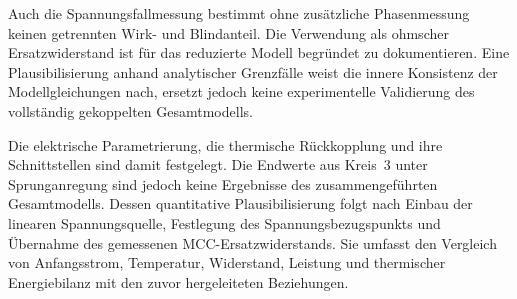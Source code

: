 Auch die Spannungsfallmessung bestimmt ohne zusätzliche Phasenmessung keinen
getrennten Wirk- und Blindanteil. Die Verwendung als ohmscher
Ersatzwiderstand ist für das reduzierte Modell begründet zu dokumentieren.
Eine Plausibilisierung anhand analytischer Grenzfälle weist die innere
Konsistenz der Modellgleichungen nach, ersetzt jedoch keine experimentelle
Validierung des vollständig gekoppelten Gesamtmodells.

Die elektrische Parametrierung, die thermische Rückkopplung und ihre
Schnittstellen sind damit festgelegt. Die Endwerte aus Kreis~3 unter
Sprunganregung sind jedoch keine Ergebnisse des zusammengeführten
Gesamtmodells. Dessen quantitative Plausibilisierung folgt nach Einbau der
linearen Spannungsquelle, Festlegung des Spannungsbezugspunkts und Übernahme
des gemessenen MCC-Ersatzwiderstands. Sie umfasst den Vergleich von
Anfangsstrom, Temperatur, Widerstand, Leistung und thermischer Energiebilanz
mit den zuvor hergeleiteten Beziehungen.


